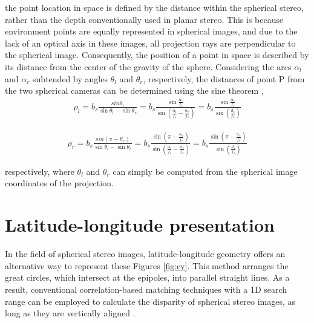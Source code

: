 \documentclass[english, LaM, oneside]{sapthesis}%
\begin{document}
 the point location in space is defined by the distance within the spherical stereo, rather than the depth conventionally used in planar stereo. This is because environment points are equally represented in spherical images, and due to the lack of an optical axis in these images, all projection rays are perpendicular to the spherical image. Consequently, the position of a point in space is described by its distance from the center of the gravity of the sphere. Considering the arcs $\alpha_l$ and $\alpha_r$ subtended by angles $\theta_l$ and $\theta_r$, respectively, the distances of point P from the two spherical cameras can be determined using the sine theorem \cite{ref:Binocular spherical,ref:Spherical stereo},
 \begin{equation}\label{eq:8}
\begin{flalign*}
         \rho_l = b_s \frac{sin\theta_r}{\sin \theta_l - \sin\theta_r} = b_s \frac{\sin \frac{\alpha_r}{f_s}}{\sin(\frac{\alpha_l}{f_s} - \frac{\alpha_r}{f_s})} =  b_s \frac{\sin \frac{\alpha_r}{f_s}}{\sin(\frac{d_s}{f_s})}
    \end{flalign*}
\end{equation}

\begin{equation}\label{eq:9}
\begin{flalign*}
         \rho_r = b_s \frac{sin (\pi - \theta_r)}{\sin \theta_l - \sin\theta_r} = b_s \frac{\sin (\pi - \frac{\alpha_r}{f_s})}{\sin(\frac{\alpha_l}{f_s} - \frac{\alpha_r}{f_s})} =  b_s \frac{\sin(\pi -  \frac{\alpha_r}{f_s})}{\sin(\frac{d_s}{f_s})}
    \end{flalign*}
\end{equation}

respectively, where $\theta_l$ and $\theta_r$ can simply be computed from the spherical image coordinates of the projection.


\section{ Latitude-longitude presentation}

In the field of spherical stereo images, latitude-longitude geometry offers an alternative way to represent these Figures \ref{fig:cy}. This method arranges the great circles, which intersect at the epipoles, into parallel straight lines\cite{f1}. As a result, conventional correlation-based matching techniques with a 1D search range can be employed to calculate the disparity of spherical stereo images, as long as they are vertically aligned \cite{f2}.
\end{document}

